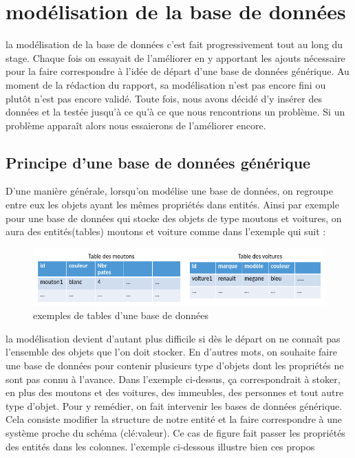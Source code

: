 \section{modélisation de la base de données}
la modélisation de la base de données c'est fait progressivement tout au long du stage. Chaque fois on essayait de l'améliorer en y apportant les ajouts nécessaire pour la faire correspondre à l'idée de départ d'une base de données générique. Au moment de la rédaction du rapport, sa modélisation n'est pas encore fini ou plutôt n'est pas encore validé. Toute fois, nous avons décidé d'y insérer des données et la testée jusqu'à ce qu'à ce que nous rencontrions un problème. Si un problème apparaît alors nous essaierons de l'améliorer encore.

\subsection{Principe d'une base de données générique}
D'une manière générale, lorsqu'on modélise une base de données, on regroupe entre eux les objets ayant les mêmes propriétés dans entités. Ainsi par exemple pour une base de données qui stocke des objets de type moutons et voitures, on aura des entités(tables) moutons et voiture comme dans l'exemple qui suit : 

\begin{figure}[h!]
\begin{center}
\includegraphics[width=1\textwidth]{images/bd_image1.png}
\end{center}
\caption{exemples de tables d'une base de données}
\label{exemples de tables d'une base de données}
\end{figure}

la modélisation devient d'autant plus difficile si dès le départ on ne connaît pas l'ensemble des objets que l'on doit stocker. En d'autres mots, on souhaite faire une base de données pour contenir plusieurs type d'objets dont les propriétés ne sont pas connu à l'avance. Dans l'exemple ci-dessus, ça correspondrait à stoker, en plus des moutons et des voitures, des immeubles, des personnes et tout autre type d'objet. Pour y remédier, on fait intervenir les bases de données générique. Cela consiste modifier la structure de notre entité et la faire correspondre à une système proche du schéma (clé:valeur). Ce cas de figure fait passer les propriétés des entités dans les colonnes.
l'exemple ci-dessous illustre bien ces propos

